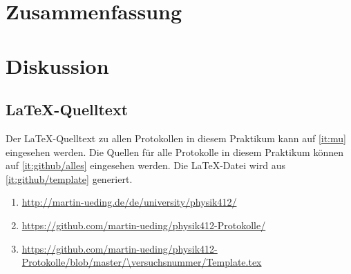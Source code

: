 \chapter{Zusammenfassung}

\chapter{Diskussion}


\FloatBarrier
\begin{appendix}
    \FloatBarrier
    \chapter{\LaTeX-Quelltext}

    Der \LaTeX-Quelltext zu allen Protokollen in diesem Praktikum kann auf
    \ref{it:mu} eingesehen werden. Die Quellen für alle Protokolle in diesem
    Praktikum können auf \ref{it:github/alles} eingesehen werden. Die
    \LaTeX-Datei wird aus \ref{it:github/template} generiert.

    \begin{enumerate}
        \item
            \label{it:mu}
            \url{http://martin-ueding.de/de/university/physik412/}
        \item
            \label{it:github/alles}
            \url{https://github.com/martin-ueding/physik412-Protokolle/}
        \item
            \label{it:github/template}
            \url{https://github.com/martin-ueding/physik412-Protokolle/blob/master/\versuchsnummer/Template.tex}
    \end{enumerate}
\end{appendix}


\FloatBarrier
\printbibliography



